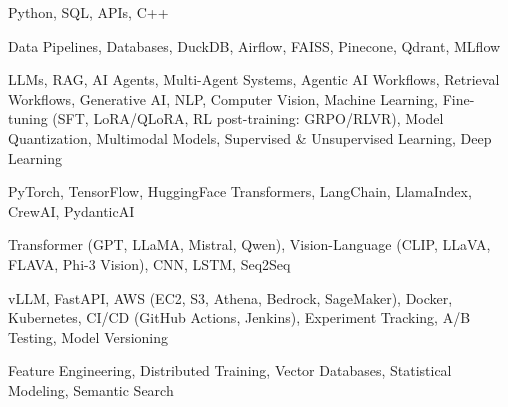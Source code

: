 \documentclass[letter,10pt]{article}
\begin{document}
 Python, SQL, APIs, C++\par\vspace{2pt}

 Data Pipelines, Databases, DuckDB, Airflow, FAISS, Pinecone, Qdrant, MLflow\par\vspace{2pt}

 LLMs, RAG, AI Agents, Multi-Agent Systems, Agentic AI Workflows, Retrieval Workflows, Generative AI, NLP, Computer Vision, Machine Learning, Fine-tuning (SFT, LoRA/QLoRA, RL post-training: GRPO/RLVR), Model Quantization, Multimodal Models, Supervised \& Unsupervised Learning, Deep Learning\par\vspace{2pt}

 PyTorch, TensorFlow, HuggingFace Transformers, LangChain, LlamaIndex, CrewAI, PydanticAI\par\vspace{2pt}

 Transformer (GPT, LLaMA, Mistral, Qwen), Vision-Language (CLIP, LLaVA, FLAVA, Phi-3 Vision), CNN, LSTM, Seq2Seq\par\vspace{2pt}

 vLLM, FastAPI, AWS (EC2, S3, Athena, Bedrock, SageMaker), Docker, Kubernetes, CI/CD (GitHub Actions, Jenkins), Experiment Tracking, A/B Testing, Model Versioning\par\vspace{2pt}

 Feature Engineering, Distributed Training, Vector Databases, Statistical Modeling, Semantic Search
\end{document}
